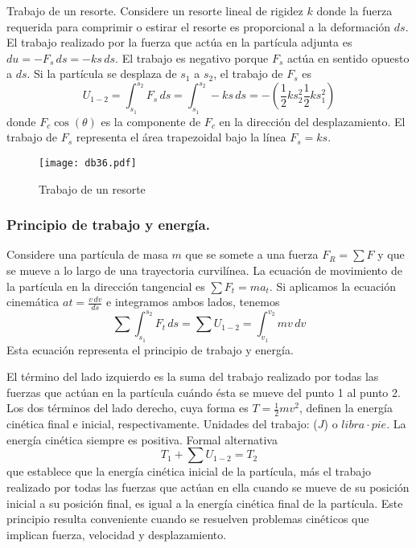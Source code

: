 Trabajo de un resorte. Considere un resorte lineal de rigidez $k$ donde la fuerza requerida para comprimir o estirar el resorte es proporcional a la deformación $ds$. El trabajo realizado por la fuerza que actúa en la partícula adjunta es $du=-F_s\,ds=-ks\,ds$. El trabajo es negativo porque $F_s$ actúa en sentido opuesto a $ds$. Si la partícula se desplaza de $s_1$ a $s_2$, el trabajo de $F_s$ es
\begin{equation*}
    U_{1 -2}=\int_{s_1}^{s_2}F_s\,ds =\int_{s_1}^{s_2}-ks\,ds = -\left(\frac{1}{2}ks_2^2 \frac{1}{2}ks_1^2\right)
\end{equation*}
donde $F_c\cos{(\theta)}$ es la componente de $F_c$ en la dirección del desplazamiento.
El trabajo de $F_s$
representa el área trapezoidal bajo la línea $F_s=ks$.
\begin{figure}[h!]
    \centering
      \texttt{[image: db36.pdf]}
      \caption{Trabajo de un resorte}
      \label{db36}
\end{figure}

\subsubsection{Principio de trabajo y energía.}

Considere una partícula de masa $m$ que se somete a una fuerza $F_R=\sum F$ y que se mueve a lo largo de una trayectoria curvilínea. La ecuación de movimiento de la partícula en la dirección tangencial es $\sum F_t=ma_t$. Si aplicamos la ecuación cinemática $at=\frac{v\,dv}{ds}$ e integramos ambos lados, tenemos
\begin{equation*}
    \sum \int_{s_1}^{s_2}F_t\, ds =\sum U_{1 - 2}= \int_{v_1}^{v_2}mv\,dv
\end{equation*}
Esta ecuación representa el principio de trabajo y energía.

El término del lado izquierdo es la suma del trabajo realizado por todas las fuerzas que actúan en la partícula cuándo ésta se mueve del punto 1 al punto 2. Los dos términos del lado derecho, cuya forma es $T=\frac{1}{2}mv^2$, definen la energía cinética final e inicial, respectivamente. Unidades del trabajo: ($J$) o $libra\cdot pie$. La energía cinética siempre es positiva. Formal alternativa
\begin{equation}
    T_1 +\sum U_{1 - 2}=T_2
\end{equation}
que establece que la energía cinética inicial de la partícula, más el trabajo realizado por todas las fuerzas que actúan en ella cuando se mueve de su posición inicial a su posición final, es igual a la energía cinética final de la partícula. Este principio resulta conveniente cuando se resuelven problemas cinéticos que implican fuerza, velocidad y desplazamiento. 

